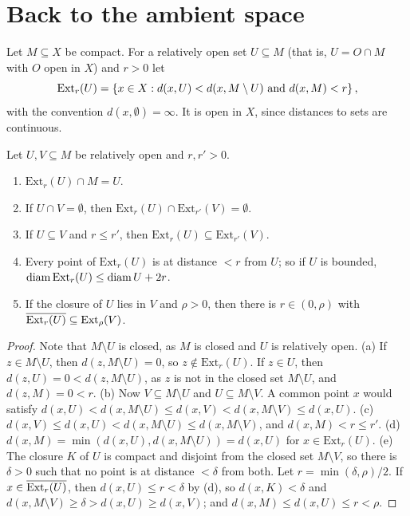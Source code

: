 \section{Back to the ambient space}\label{sec:lift}

Let $M\subseteq X$ be compact. For a relatively open set $U\subseteq M$ (that is, $U=O\cap M$ with $O$ open in $X$) and $r>0$ let
\[
\mathrm{Ext}_r(U)=\left\{ x\in X: d(x,U)<d(x,M\setminus U)\text{ and }d(x,M)<r \right\},
\]
with the convention $d(x,\emptyset)=\infty$. It is open in $X$, since distances to sets are continuous.

\begin{lemma}\label{lem:ext}
Let $U,V\subseteq M$ be relatively open and $r,r'>0$.
\begin{enumerate}[label=(\alph*)]
\item $\mathrm{Ext}_r(U)\cap M=U$.
\item If $U\cap V=\emptyset$, then $\mathrm{Ext}_r(U)\cap\mathrm{Ext}_{r'}(V)=\emptyset$.
\item If $U\subseteq V$ and $r\le r'$, then $\mathrm{Ext}_r(U)\subseteq\mathrm{Ext}_{r'}(V)$.
\item Every point of $\mathrm{Ext}_r(U)$ is at distance $<r$ from $U$; so if $U$ is bounded, $\operatorname{diam}\mathrm{Ext}_r(U)\le\operatorname{diam} U+2r$.
\item If the closure of $U$ lies in $V$ and $\rho>0$, then there is $r\in(0,\rho)$ with $\overline{\mathrm{Ext}_r(U)}\subseteq\mathrm{Ext}_\rho(V)$.
\end{enumerate}
\end{lemma}

\begin{proof}
Note that $M\setminus U$ is closed, as $M$ is closed and $U$ is relatively open.
(a) If $z\in M\setminus U$, then $d(z,M\setminus U)=0$, so $z\notin\mathrm{Ext}_r(U)$. If $z\in U$, then $d(z,U)=0<d(z,M\setminus U)$, as $z$ is not in
the closed set $M\setminus U$, and $d(z,M)=0<r$.
(b) Now $V\subseteq M\setminus U$ and $U\subseteq M\setminus V$. A common point $x$ would satisfy $d(x,U)<d(x,M\setminus U)\le d(x,V)<d(x,M\setminus
V)\le d(x,U)$.
(c) $d(x,V)\le d(x,U)<d(x,M\setminus U)\le d(x,M\setminus V)$, and $d(x,M)<r\le r'$.
(d) $d(x,M)=\min(d(x,U),d(x,M\setminus U))=d(x,U)$ for $x\in\mathrm{Ext}_r(U)$.
(e) The closure $K$ of $U$ is compact and disjoint from the closed set $M\setminus V$, so there is $\delta>0$ such that no point is at distance
$<\delta$ from both. Let $r=\min(\delta,\rho)/2$. If $x\in\overline{\mathrm{Ext}_r(U)}$, then $d(x,U)\le r<\delta$ by (d), so $d(x,K)<\delta$ and
$d(x,M\setminus V)\ge\delta>d(x,U)\ge d(x,V)$; and $d(x,M)\le d(x,U)\le r<\rho$.
\end{proof}

